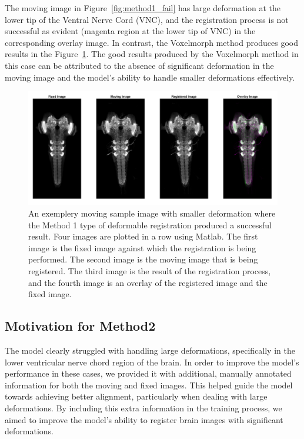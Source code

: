 \documentclass{report}
\begin{document}
	 The moving image in Figure~\ref{fig:method1_fail} has large deformation at the lower tip of the Ventral Nerve Cord (VNC), and the registration process is not successful as evident (magenta region at the lower tip of VNC) in the corresponding overlay image. In contrast, the Voxelmorph method produces good results in the Figure~\ref{fig:method1_pas}. The good results produced by the Voxelmorph method in this case can be attributed to the absence of significant deformation in the moving image and the model's ability to handle smaller deformations effectively.

	\begin{figure}[h!]
		\centering
		\includegraphics[width=0.9\columnwidth]{resources/chapter4/np_brain7_scaled.tif.png}
		\caption{An exemplery moving sample image with smaller deformation where the Method 1 type of deformable registration produced a successful result. Four images are plotted in a row using Matlab. The first image is the fixed image against which the registration is being performed. The second image is the moving image that is being registered. The third image is the result of the registration process, and the fourth image is an overlay of the registered image and the fixed image.}
		\label{fig:method1_pas}
	\end{figure}
	
	\subsection{Motivation for Method2}
	The model clearly struggled with handling large deformations, specifically in the lower ventricular nerve chord region of the brain. In order to improve the model's performance in these cases, we provided it with additional, manually annotated information for both the moving and fixed images. This helped guide the model towards achieving better alignment, particularly when dealing with large deformations. By including this extra information in the training process, we aimed to improve the model's ability to register brain images with significant deformations.
	
\end{document}
